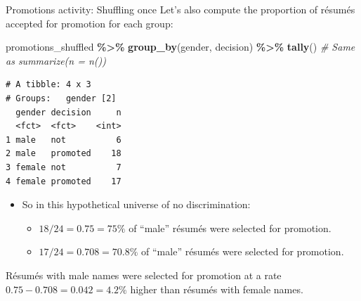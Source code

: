 \documentclass[
  ignorenonframetext,
]{beamer}
\newenvironment{Shaded}{\begin{snugshade}}{\end{snugshade}}
\newcommand{\CommentTok}[1]{\textcolor[rgb]{0.56,0.35,0.01}{\textit{#1}}}
\newcommand{\FunctionTok}[1]{\textcolor[rgb]{0.13,0.29,0.53}{\textbf{#1}}}
\newcommand{\NormalTok}[1]{#1}
\newcommand{\SpecialCharTok}[1]{\textcolor[rgb]{0.81,0.36,0.00}{\textbf{#1}}}
\providecommand{\tightlist}{%
  \setlength{\itemsep}{0pt}\setlength{\parskip}{0pt}}
\begin{document}
\begin{frame}[fragile]{Promotions activity: Shuffling once}
\protect\hypertarget{promotions-activity-shuffling-once-5}{}
Let's also compute the proportion of résumés accepted for promotion for
each group:

\tiny

\begin{Shaded}
\begin{Highlighting}[]
\NormalTok{promotions\_shuffled }\SpecialCharTok{\%\textgreater{}\%} 
  \FunctionTok{group\_by}\NormalTok{(gender, decision) }\SpecialCharTok{\%\textgreater{}\%} 
  \FunctionTok{tally}\NormalTok{() }\CommentTok{\# Same as summarize(n = n())}
\end{Highlighting}
\end{Shaded}

\begin{verbatim}
# A tibble: 4 x 3
# Groups:   gender [2]
  gender decision     n
  <fct>  <fct>    <int>
1 male   not          6
2 male   promoted    18
3 female not          7
4 female promoted    17
\end{verbatim}

\normalsize

\begin{itemize}
\item
  So in this hypothetical universe of no discrimination:

  \begin{itemize}
  \tightlist
  \item
    \(18/24=0.75=75\%\) of ``male'' résumés were selected for promotion.
  \item
    \(17/24=0.708=70.8\%\) of ``male'' résumés were selected for
    promotion.
  \end{itemize}
\end{itemize}

Résumés with male names were selected for promotion at a rate
\(0.75 -0.708 = 0.042 = 4.2\%\) higher than résumés with female names.
\end{frame}
\end{document}
